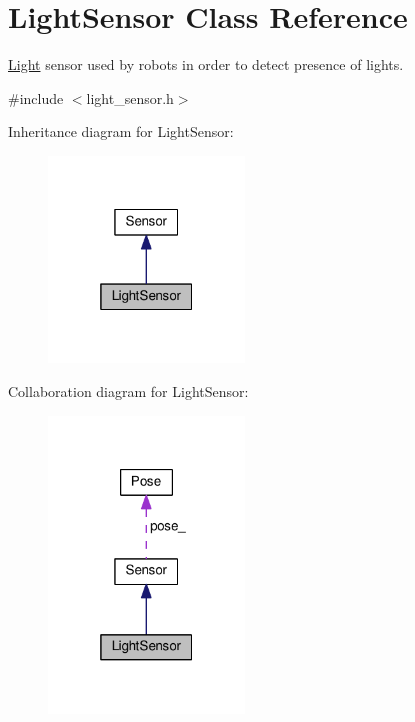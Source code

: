 \hypertarget{classLightSensor}{}\section{Light\+Sensor Class Reference}
\label{classLightSensor}


\hyperlink{classLight}{Light} sensor used by robots in order to detect presence of lights.  




{\ttfamily \#include $<$light\+\_\+sensor.\+h$>$}



Inheritance diagram for Light\+Sensor\+:\nopagebreak
\begin{figure}[H]
\begin{center}
\leavevmode
\includegraphics[width=148pt]{classLightSensor__inherit__graph}
\end{center}
\end{figure}


Collaboration diagram for Light\+Sensor\+:\nopagebreak
\begin{figure}[H]
\begin{center}
\leavevmode
\includegraphics[width=148pt]{classLightSensor__coll__graph}
\end{center}
\end{figure}
